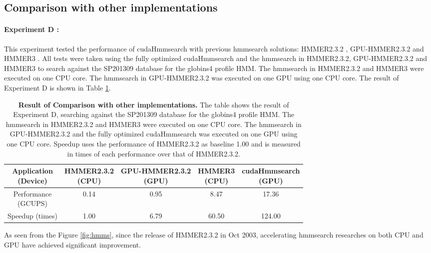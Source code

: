 \subsection{Comparison with other implementations}
\paragraph*{Experiment D : } This experiment tested the performance of cudaHmmsearch with previous hmmsearch solutions: HMMER2.3.2 \citep{HMMER2}, GPU-HMMER2.3.2 \citep{GPUHMM} and HMMER3 \citep{Hsource}.
All tests were taken using the fully optimized cudaHmmsearch and the hmmsearch in HMMER2.3.2, GPU-HMMER2.3.2 and HMMER3 to search against the SP201309 database for the globins4 profile HMM. The hmmsearch in HMMER2.3.2 and HMMER3 were executed on one CPU core. The hmmsearch in GPU-HMMER2.3.2 was executed on one GPU using one CPU core. The result of Experiment D is shown in Table \ref{tab.hmms}.

\begin{table}[H]
\centering
\begin{tabular}{|c|c|c|c|c|}\hline
\shortstack{Application \\ (Device)} & \shortstack{HMMER2.3.2 \\ (CPU)} & \shortstack{GPU-HMMER2.3.2 \\ (GPU)} & \shortstack{HMMER3 \\ (CPU)} & \shortstack{cudaHmmsearch \\ (GPU)} \\\hline
\shortstack{Performance\\ (GCUPS)} & 0.14 & 0.95 & 8.47 & 17.36 \\\hline
Speedup (times) & 1.00 & 6.79 & 60.50 & 124.00 \\\hline
\end{tabular}
\caption{\selectfont \textbf{Result of Comparison with other implementations.} \label{tab.hmms} The table shows the result of Experiment D, searching against the SP201309 database for the globins4 profile HMM. The hmmsearch in HMMER2.3.2 and HMMER3 were executed on one CPU core. The hmmsearch in GPU-HMMER2.3.2 and the fully optimized cudaHmmsearch was executed on one GPU using one CPU core. Speedup uses the performance of HMMER2.3.2 as baseline 1.00 and is measured in times of each performance over that of HMMER2.3.2.}
\end{table}

As seen from the Figure \ref{fig:hmms}, since the release of HMMER2.3.2 in Oct 2003, accelerating hmmsearch researches on both CPU and GPU have achieved significant improvement.

